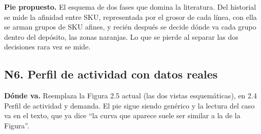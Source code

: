 \documentclass[a4paper,10pt]{article}
\newcommand{\donde}[1]{\par\noindent\textbf{Dónde va.} #1\par\smallskip}
\newcommand{\pie}[1]{\par\noindent\textbf{Pie propuesto.} #1\par\smallskip}
\begin{document}
\pie{El esquema de dos fases que domina la literatura. Del historial se mide
la afinidad entre SKU, representada por el grosor de cada línea, con ella se
arman grupos de SKU afines, y recién después se decide dónde va cada grupo
dentro del depósito, las zonas naranjas. Lo que se pierde al separar las dos
decisiones rara vez se mide.}

\clearpage
\subsection{N6. Perfil de actividad con datos reales}

\donde{Reemplaza la Figura 2.5 actual (las dos vistas esquemáticas), en 2.4
Perfil de actividad y demanda. El pie sigue siendo genérico y la lectura del
caso va en el texto, que ya dice ``la curva que aparece suele ser similar a la
de la Figura''.}
\end{document}
